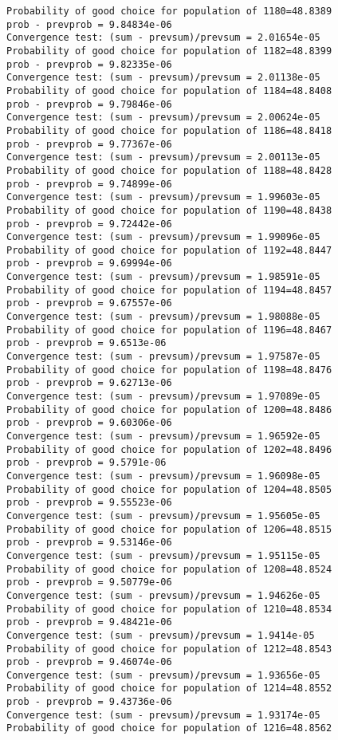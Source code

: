\documentclass[11pt,onecolumn]{article}
\begin{document}
\begin{verbatim}
Probability of good choice for population of 1180=48.8389
prob - prevprob = 9.84834e-06
Convergence test: (sum - prevsum)/prevsum = 2.01654e-05
Probability of good choice for population of 1182=48.8399
prob - prevprob = 9.82335e-06
Convergence test: (sum - prevsum)/prevsum = 2.01138e-05
Probability of good choice for population of 1184=48.8408
prob - prevprob = 9.79846e-06
Convergence test: (sum - prevsum)/prevsum = 2.00624e-05
Probability of good choice for population of 1186=48.8418
prob - prevprob = 9.77367e-06
Convergence test: (sum - prevsum)/prevsum = 2.00113e-05
Probability of good choice for population of 1188=48.8428
prob - prevprob = 9.74899e-06
Convergence test: (sum - prevsum)/prevsum = 1.99603e-05
Probability of good choice for population of 1190=48.8438
prob - prevprob = 9.72442e-06
Convergence test: (sum - prevsum)/prevsum = 1.99096e-05
Probability of good choice for population of 1192=48.8447
prob - prevprob = 9.69994e-06
Convergence test: (sum - prevsum)/prevsum = 1.98591e-05
Probability of good choice for population of 1194=48.8457
prob - prevprob = 9.67557e-06
Convergence test: (sum - prevsum)/prevsum = 1.98088e-05
Probability of good choice for population of 1196=48.8467
prob - prevprob = 9.6513e-06
Convergence test: (sum - prevsum)/prevsum = 1.97587e-05
Probability of good choice for population of 1198=48.8476
prob - prevprob = 9.62713e-06
Convergence test: (sum - prevsum)/prevsum = 1.97089e-05
Probability of good choice for population of 1200=48.8486
prob - prevprob = 9.60306e-06
Convergence test: (sum - prevsum)/prevsum = 1.96592e-05
Probability of good choice for population of 1202=48.8496
prob - prevprob = 9.5791e-06
Convergence test: (sum - prevsum)/prevsum = 1.96098e-05
Probability of good choice for population of 1204=48.8505
prob - prevprob = 9.55523e-06
Convergence test: (sum - prevsum)/prevsum = 1.95605e-05
Probability of good choice for population of 1206=48.8515
prob - prevprob = 9.53146e-06
Convergence test: (sum - prevsum)/prevsum = 1.95115e-05
Probability of good choice for population of 1208=48.8524
prob - prevprob = 9.50779e-06
Convergence test: (sum - prevsum)/prevsum = 1.94626e-05
Probability of good choice for population of 1210=48.8534
prob - prevprob = 9.48421e-06
Convergence test: (sum - prevsum)/prevsum = 1.9414e-05
Probability of good choice for population of 1212=48.8543
prob - prevprob = 9.46074e-06
Convergence test: (sum - prevsum)/prevsum = 1.93656e-05
Probability of good choice for population of 1214=48.8552
prob - prevprob = 9.43736e-06
Convergence test: (sum - prevsum)/prevsum = 1.93174e-05
Probability of good choice for population of 1216=48.8562

\end{verbatim}
\end{document}
